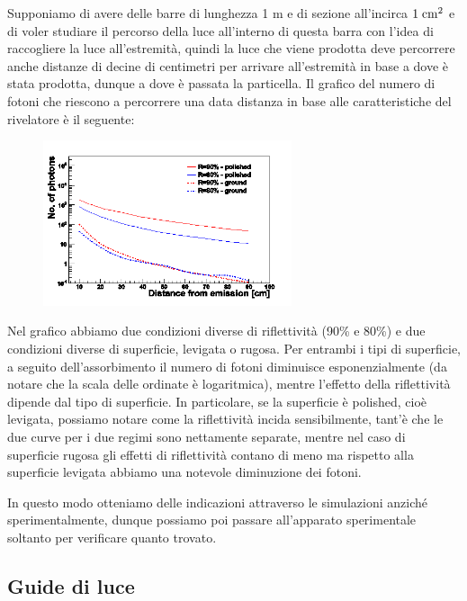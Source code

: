 \begin{esempio}
   Supponiamo di avere delle barre di lunghezza 1 m e di sezione all'incirca $1 \; \rm cm^2$ e di voler studiare il percorso della luce all'interno di questa barra con l'idea di raccogliere la luce all'estremità, quindi la luce che viene prodotta deve percorrere anche distanze di decine di centimetri per arrivare all'estremità in base a dove è stata prodotta, dunque a dove è passata la particella. Il grafico del numero di fotoni che riescono a percorrere una data distanza in base alle caratteristiche del rivelatore è il seguente:
   \begin{figure}[H]
      \centering
      \includegraphics[width=0.65\textwidth]{immagini/grafico_numero_fotoni.png}
   \end{figure}
   Nel grafico abbiamo due condizioni diverse di riflettività (90\% e 80\%) e due condizioni diverse di superficie, levigata o rugosa. Per entrambi i tipi di superficie, a seguito dell'assorbimento il numero di fotoni diminuisce esponenzialmente (da notare che la scala delle ordinate è logaritmica), mentre l'effetto della riflettività dipende dal tipo di superficie. In particolare, se la superficie è polished, cioè levigata, possiamo notare come la riflettività incida sensibilmente, tant'è che le due curve per i due regimi sono nettamente separate, mentre nel caso di superficie rugosa gli effetti di riflettività contano di meno ma rispetto alla superficie levigata abbiamo una notevole diminuzione dei fotoni.
   
   In questo modo otteniamo delle indicazioni attraverso le simulazioni anziché sperimentalmente, dunque possiamo poi passare all'apparato sperimentale soltanto per verificare quanto trovato.
\end{esempio}

\subsection{Guide di luce}

